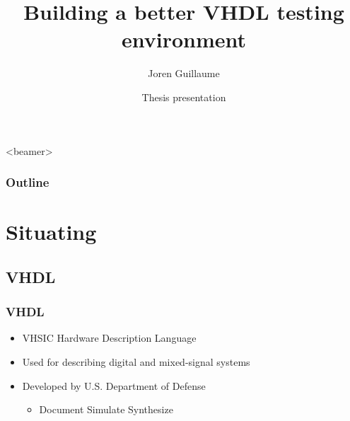 \documentclass[british,10pt]{beamer}
\title{Building a better VHDL testing environment}
\author[J. Guillaume]{Joren Guillaume}
\date[JAN'15, Gent]{Thesis presentation}
\institute[Ghent University]
{
  FEA\\
  Ghent University
}
\begin{document}
\begin{frame}[plain]
  \titlepage
\end{frame}



\begin{frame}<beamer>\frametitle{Outline}
  \tableofcontents
\end{frame}

\section{Situating}
\subsection{VHDL}
\begin{frame}\frametitle{VHDL}
\begin{itemize}
\item VHSIC Hardware Description Language
\item Used for describing digital and mixed-signal systems 
\item Developed by U.S. Department of Defense
\begin{itemize}
\item Document  Simulate  Synthesize
\end{itemize}
\end{itemize}
\end{frame}
\end{document}
